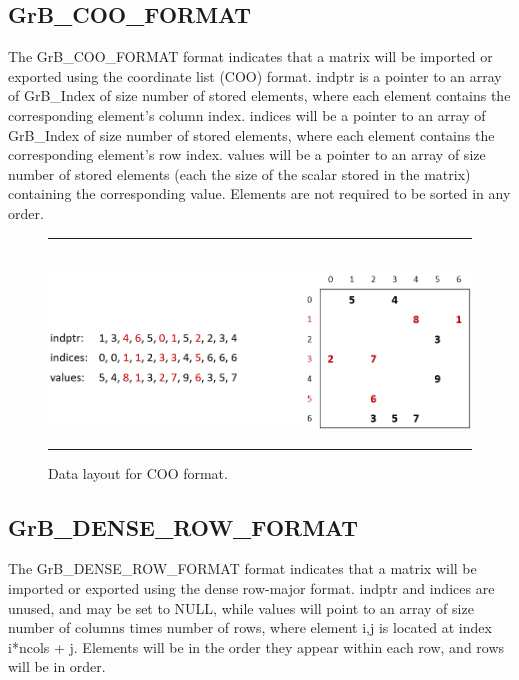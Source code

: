 \subsection{{\sf GrB\_COO\_FORMAT}}

The {\sf GrB\_COO\_FORMAT} format
indicates that a matrix will be imported or exported using the coordinate list
(COO) format.  {\sf indptr} is a pointer to an array of {\sf GrB\_Index} of size 
number of stored elements,
where each element contains the corresponding element's column index.
{\sf indices} will be a pointer to an array of {\sf GrB\_Index} of size 
number of stored elements, where each
element contains the corresponding element's row index.
{\sf values} will be a pointer to an array of size number of
stored elements (each the size of the scalar stored in the matrix) containing the corresponding value. Elements
are not required to be sorted in any order.

\begin{figure}[h]
    \hrule
    \begin{center}
        ~\\
        \includegraphics[width=4.5in]{GrB_COO_FORMAT.png}
    \end{center}
    \vspace{-1em}
    \caption{Data layout for COO format.}
    \hrule
\end{figure}

\subsection{{\sf GrB\_DENSE\_ROW\_FORMAT}}

The {\sf GrB\_DENSE\_ROW\_FORMAT} format indicates that a matrix will be imported
or exported using the dense row-major format.  {\sf indptr} and {\sf indices} are unused,
and may be set to NULL, while {\sf values} will point to an array of size number of columns
times number of rows, where element i,j is located at index i*ncols + j. Elements will be
in the order they appear within each row, and rows will be in order.

